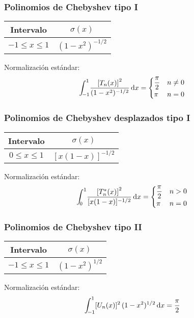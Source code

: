 \documentclass[12pt]{beamer}
\begin{document}
\begin{frame}
\frametitle{Polinomios de Chebyshev tipo I}
\begin{table}
  \begin{tabular}{c c}
  Intervalo & $\sigma (x)$ \\ \hline
  $-1 \leq x \leq 1$ & $(1 - x^{2})^{-1/2}$ \\ \hline 
\end{tabular}
\end{table}
Normalización estándar:
\begin{align*}
\scaleint{5ex}_{\bs -1}^{1} \dfrac{\left[ T_{n}(x) \right]^{2}}{(1 - x^{2})^{-1/2}} \dd{x} = \begin{cases} 
\displaystyle \frac{\pi}{2} & n \neq 0 \\
\pi & n = 0 \end{cases}
\end{align*}
\end{frame}
\begin{frame}
\frametitle{Polinomios de Chebyshev desplazados tipo I}
\begin{table}
  \begin{tabular}{c c}
  Intervalo & $\sigma (x)$ \\ \hline
  $0 \leq x \leq 1$ & $[x (1 - x)]^{-1/2}$ \\ \hline 
\end{tabular}
\end{table}
Normalización estándar:
\begin{align*}
\scaleint{5ex}_{\bs 0}^{1} \dfrac{\left[ T_{n}^{*} (x) \right]^{2}}{[x (1 - x)]^{-1/2}} \dd{x} = \begin{cases} 
\displaystyle \frac{\pi}{2} & n > 0 \\
\pi & n = 0 \end{cases}
\end{align*}
\end{frame}
\begin{frame}
\frametitle{Polinomios de Chebyshev tipo II}
\begin{table}
\begin{tabular}{c c}
Intervalo & $\sigma (x)$ \\ \hline
$-1 \leq x \leq 1$ & $(1 - x^{2})^{1/2}$ \\ \hline
\end{tabular}
\end{table}
Normalización estándar:
\begin{align*}
\scaleint{5ex}_{\bs -1}^{1} [U_{n} (x)]^{2} \, (1 - x^{2})^{1/2} \, \dd x = \frac{\pi}{2}
\end{align*}
\end{frame}
\end{document}
